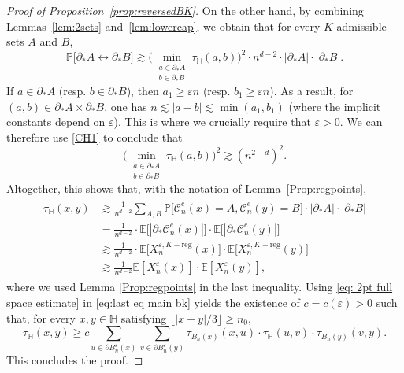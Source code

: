 \documentclass[11pt,a4paper]{article}
\numberwithin{equation}{section}
\theoremstyle{plain}
\theoremstyle{definition}
\begin{document}
\begin{proof}[Proof of Proposition~\textup{\ref{prop:reversedBK}}]
On the other hand, by combining Lemmas~\ref{lem:2sets} and~\ref{lem:lowercap}, we obtain that for every $K$-admissible sets $A$ and $B$,
\begin{equation} 
\mathbb P\big[  \partial_*A  \longleftrightarrow \partial_*B\big]\gtrsim \Big(\min_{\substack{a\in \partial_*A\\b\in \partial_* B}}\tau_{\mathbb H}(a,b)\Big)^2\cdot n^{d-2} \cdot |\partial_*A| \cdot |\partial_*B|.
\end{equation} 
If $a\in \partial_*A$ (resp. $b\in\partial_*B$), then $a_1\geq \varepsilon n$ (resp. $b_1\geq \varepsilon n$). As a result, for $(a,b)\in \partial_*A\times \partial_*B$, one has $n\lesssim |a-b|\lesssim \min(a_1,b_1)$ (where the implicit constants depend on $\varepsilon$). This is where we crucially require that $\varepsilon>0$. We can therefore use \eqref{CH1} to conclude that
\begin{equation}
	\Big(\min_{\substack{a\in \partial_*A\\b\in \partial_* B}}\tau_{\mathbb H}(a,b)\Big)^2\gtrsim (n^{2-d})^2.
\end{equation}
Altogether, this shows that, with the notation of Lemma~\ref{Prop:regpoints}, 
\begin{align}\label{eq:last eq main bk} 
\begin{split}
\tau_{\mathbb H}(x,y) & \gtrsim  \frac 1{n^{d-2}} \sum_{A,B} \mathbb P\big[\mathcal C_n^e(x) = A, \mathcal C_n^e(y) = B\big] \cdot |\partial_*A| \cdot |\partial_*B| \\
& = \frac 1{n^{d-2}}\cdot \mathbb E\big[|\partial_* \mathcal C_n^e(x)|\big] \cdot \mathbb E\big[|\partial_* \mathcal C_n^e(y)|\big] \\&\gtrsim \frac 1{n^{d-2}}\cdot \mathbb E\big[X_n^{\varepsilon,K-\textrm{reg}}(x)\big]\cdot \mathbb E\big[X_n^{\varepsilon,K-\textrm{reg}}(y)\big]
\\&\gtrsim \frac{1}{n^{d-2}}\mathbb E[X_n^{\varepsilon}(x)]\cdot \mathbb E[X_n^\varepsilon(y)], 
\end{split}
\end{align}
where we used Lemma \ref{Prop:regpoints} in the last inequality. Using \eqref{eq: 2pt full space estimate} in \eqref{eq:last eq main bk} yields the existence of $c=c(\varepsilon)>0$ such that, for every $x,y\in \mathbb H$ satisfying $\lfloor |x-y|/3\rfloor\geq n_0$,
\begin{equation}
\tau_{\mathbb H}(x,y)\ge c \sum_{u\in \partial B_n^\varepsilon(x)} \sum_{v\in \partial B_n^\varepsilon(y)} 
\tau_{B_n(x)}(x,u)\cdot \tau_{\mathbb H}(u,v)\cdot \tau_{B_n(y)}(v,y).
\end{equation}
This concludes the proof.
\end{proof}
 
\end{document}
